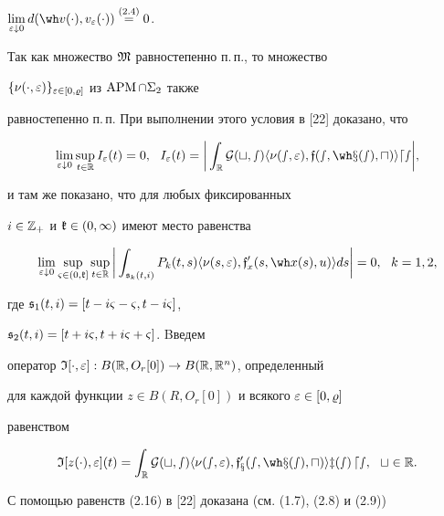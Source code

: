 $\lim\lt_{\ve\downarrow 0} d(\wh v(\cdot),v_{\ve}(\cdot))


\overset{(2.4)}{=}{}0$.


Так как множество $\frak M$ равностепенно п.\,п., то множество


$\{\nu(\cdot,\varepsilon)\}_{\varepsilon\in[0,\varrho]}$ из $\operatorname{APM}\cap\Sigma_2$ также


равностепенно п.\,п. При выполнении этого условия в [22] доказано, что


\begin{equation}


\lim_{\ve\downarrow 0} \sup_{t\in\R} I_{\ve}(t)=0,\ \


I_{\ve}(t)= \bigg| \int_{\R} \pG(t,s)


\la \nu(s,\ve), \frak{f}(s,\wh x(s),u) \ra ds\bigg|,


\end{equation}


и там же показано, что для любых фиксированных


$i\in\Bbb Z_{+}$ и $\frak k\in(0,\infty)$ имеют место равенства


\begin{equation}


\lim_{\ve\downarrow 0}


\sup_{\vsg\in(0,\gk]}


\sup_{t\in\R}\bigg|\int_{\gs_k(t,i)}


P_k(t,s) \la\nu(s,\ve), \frak{f}_x'(s,\wh x(s),u)\ra ds\bigg|=0,


\ \ k=1,2,


\end{equation}


где $\frak s_1(t,i)=[t-i\varsigma-\varsigma,t-i\varsigma]$,


$\frak s_2(t,i)=[t+i\varsigma,t+i\varsigma+\varsigma]$. Bведем


оператор $\frak I[\cdot,\varepsilon]: B(\Bbb R,O_r[0])\to B(\Bbb R,\Bbb R^n)$, определенный


для каждой функции $z\in B(R,O_r[0])$ и всякого $\varepsilon\in[0,\varrho]$


равенством


$$


\frak I[z(\cdot),\ve](t)= \int_{\R} \pG(t,s)\la


\nu(s,\ve), \frak{f}_x'(s,\wh x(s),u)\ra z(s)\,ds,\ \ t\in\R.


$$





С помощью равенств (2.16) в [22] доказана (см. (1.7), (2.8) и (2.9))





